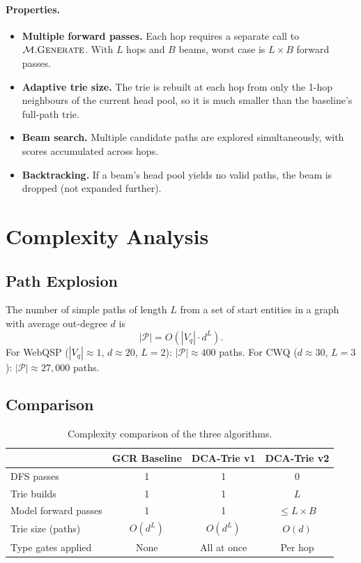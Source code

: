 \documentclass[11pt,a4paper]{article}
\begin{document}
\paragraph{Properties.}
\begin{itemize}
  \item \textbf{Multiple forward passes.}  Each hop requires a separate
    call to $\mathcal{M}.\textsc{Generate}$.  With $L$ hops and $B$
    beams, worst case is $L \times B$ forward passes.
  \item \textbf{Adaptive trie size.}  The trie is rebuilt at each hop
    from only the 1-hop neighbours of the current head pool, so it is
    much smaller than the baseline's full-path trie.
  \item \textbf{Beam search.}  Multiple candidate paths are explored
    simultaneously, with scores accumulated across hops.
  \item \textbf{Backtracking.}  If a beam's head pool yields no valid
    paths, the beam is dropped (not expanded further).
\end{itemize}

\section{Complexity Analysis}

\subsection{Path Explosion}

The number of simple paths of length $L$ from a set of start entities
in a graph with average out-degree $d$ is
\[
  |\mathcal{P}| = O(|V_q| \cdot d^L).
\]
For WebQSP ($|V_q| \approx 1$, $d \approx 20$, $L = 2$): $|\mathcal{P}|
\approx 400$ paths.  For CWQ ($d \approx 30$, $L = 3$):
$|\mathcal{P}| \approx 27{,}000$ paths.

\subsection{Comparison}

\begin{table}[H]
\centering
\caption{Complexity comparison of the three algorithms.}
\label{tab:complexity}
\begin{tabular}{@{}lccc@{}}
\toprule
 & \textbf{GCR Baseline} & \textbf{DCA-Trie v1} &
  \textbf{DCA-Trie v2} \\
\midrule
DFS passes & 1 & 1 & 0 \\
Trie builds & 1 & 1 & $L$ \\
Model forward passes & 1 & 1 & $\leq L \times B$ \\
Trie size (paths) & $O(d^L)$ & $O(d^L)$ & $O(d)$ \\
Type gates applied & None & All at once & Per hop \\
\bottomrule
\end{tabular}
\end{table}
\end{document}

